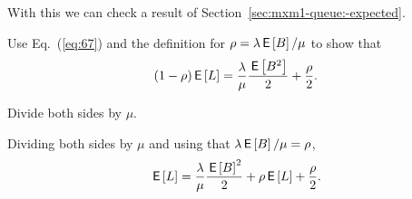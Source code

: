With this we can check a result of Section~\ref{sec:mxm1-queue:-expected}.  
\begin{exercise}
  Use Eq.~(\ref{eq:67}) and the definition for
  $\rho=\lambda \,\mathsf{E}\left[B\right]/\mu$ to show that
\begin{equation*}
(1- \rho) \,\mathsf{E}\left[L\right] = \frac{\lambda}\mu \frac{\,\mathsf{E}\left[B^2\right]}2 + \frac\rho2.
\end{equation*}
\begin{hint}
Divide both sides by $\mu$.
\end{hint}
\begin{solution}
Dividing both sides by $\mu$ and using that $\lambda \,\mathsf{E}\left[B\right]/\mu = \rho$, 
\begin{equation*}
  \,\mathsf{E}\left[L\right] = \frac{\lambda}{\mu}  \frac{\,\mathsf{E}\left[B\right]^2 }2 + \rho \,\mathsf{E}\left[L\right] + \frac\rho2.
\end{equation*}
\end{solution}
\end{exercise}



